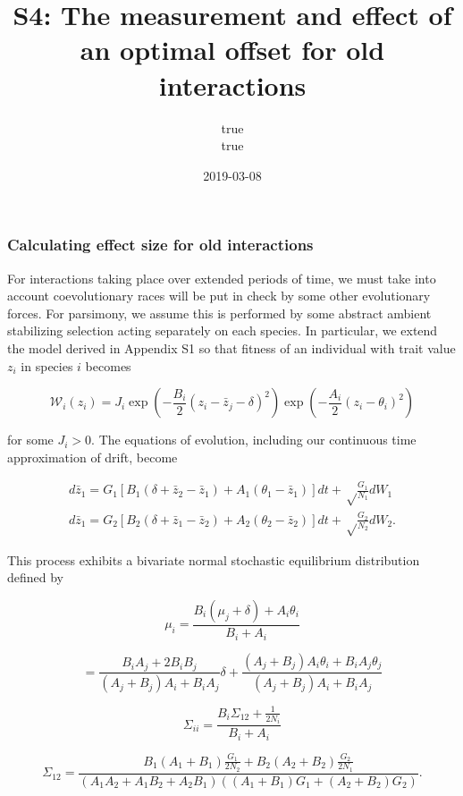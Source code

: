 \documentclass[]{article}
\title{S4: The measurement and effect of an optimal offset for old interactions}
\author{true \\ true}
\date{2019-03-08}
\begin{document}
\maketitle

{
\setcounter{tocdepth}{3}
\tableofcontents
}
\newcommand{\R}{\mathbb{R}}
\newcommand{\E}{\mathbb{E}}
\newcommand{\V}{\mathbb{V}}
\newcommand{\Z}{\mathbb{Z}}
\newcommand{\N}{\mathbb{N}}
\newcommand{\B}{\mathscr{B}}
\newcommand{\W}{\mathscr{W}}
\newcommand{\ra}{\rightarrow}

\hypertarget{calculating-effect-size-for-old-interactions}{%
\subsubsection{Calculating effect size for old
interactions}\label{calculating-effect-size-for-old-interactions}}

For interactions taking place over extended periods of time, we must
take into account coevolutionary races will be put in check by some
other evolutionary forces. For parsimony, we assume this is performed by
some abstract ambient stabilizing selection acting separately on each
species. In particular, we extend the model derived in Appendix S1 so
that fitness of an individual with trait value \(z_i\) in species \(i\)
becomes

\[\mathscr{W}_i(z_i)=J_i\exp\left(-\frac{B_i}{2}(z_i-\bar z_j-\delta)^2\right)\exp\left(-\frac{A_i}{2}(z_i-\theta_i)^2\right)\]

for some \(J_i>0\). The equations of evolution, including our continuous
time approximation of drift, become

\[\begin{matrix}
d\bar z_1=G_1[B_1(\delta+\bar z_2-\bar z_1)+A_1(\theta_1-\bar z_1)]dt+\sqrt\frac{G_1}{N_1}dW_1\\
d\bar z_1=G_2[B_2(\delta+\bar z_1-\bar z_2)+A_2(\theta_2-\bar z_2)]dt+\sqrt\frac{G_2}{N_2}dW_2.
\end{matrix}\]

This process exhibits a bivariate normal stochastic equilibrium
distribution defined by

\[\mu_i=\frac{B_i(\mu_j+\delta)+A_i\theta_i}{B_i+A_i}\]

\[=\frac{B_iA_j+2B_iB_j}{(A_j+B_j)A_i+B_iA_j}\delta+\frac{(A_j+B_j)A_i\theta_i+B_iA_j\theta_j}{(A_j+B_j)A_i+B_iA_j}\]

\[\Sigma_{ii}=\frac{B_i\Sigma_{12}+\frac{1}{2N_i}}{B_i+A_i}\]

\[\Sigma_{12}=\frac{B_1(A_1+B_1)\frac{G_1}{2N_2}+
B_2(A_2+B_2)\frac{G_2}{2N_1}}{(A_1A_2+A_1B_2+A_2B_1)((A_1+B_1)G_1+(A_2+B_2)G_2)}.\]
\end{document}

